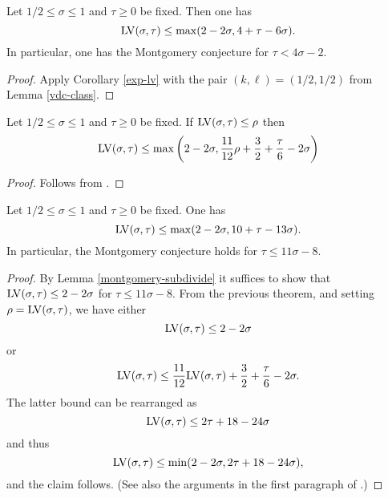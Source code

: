 \begin{theorem}\label{huxley-lv}\cite[Equation~(2.9)]{Huxley} Let $1/2 \leq \sigma \leq 1$ and $\tau \geq 0$ be fixed.  Then one has
    $$ \mathrm{LV}(\sigma,\tau) \leq \max( 2-2\sigma, 4 + \tau - 6 \sigma).$$
    In particular, one has the Montgomery conjecture for $\tau < 4 \sigma - 2$.
\end{theorem}

\literature
{}

\begin{proof}  Apply Corollary \ref{exp-lv} with the pair $(k,\ell) = (1/2,1/2)$ from Lemma \ref{vdc-class}.
\end{proof}





\begin{theorem}\label{heath_brown-lv-prelim} Let $1/2 \leq \sigma \leq 1$ and $\tau \geq 0$ be fixed.  If $\mathrm{LV}(\sigma, \tau) \le \rho$ then
    \[
    \mathrm{LV}(\sigma, \tau) \le \max\left(2 - 2\sigma, \frac{11}{12}\rho + \frac{3}{2} + \frac{\tau}{6} - 2\sigma\right)
    \]
\end{theorem}

\literature
{}

\begin{proof}
    Follows from \cite[Lemma~1]{heathbrown_zero_1979}.
\end{proof}

\begin{theorem}\label{hb-opt} Let $1/2 \leq \sigma \leq 1$ and $\tau \geq 0$ be fixed.   One has
    $$ \mathrm{LV}(\sigma,\tau) \leq \max( 2-2\sigma, 10 + \tau - 13 \sigma).$$
In particular, the Montgomery conjecture holds for $\tau \leq 11 \sigma - 8$.
\end{theorem}

\begin{proof}  By Lemma \ref{montgomery-subdivide} it suffices to show that $\mathrm{LV}(\sigma,\tau) \leq 2-2\sigma$ for $\tau \leq 11\sigma-8$.  From the previous theorem, and setting $\rho = \mathrm{LV}(\sigma,\tau)$, we have either
$$ \mathrm{LV}(\sigma,\tau) \leq 2-2\sigma$$
or
$$ \mathrm{LV}(\sigma,\tau) \leq \frac{11}{12}\mathrm{LV}(\sigma,\tau) + \frac{3}{2} + \frac{\tau}{6} - 2\sigma.$$
The latter bound can be rearranged as
$$ \mathrm{LV}(\sigma,\tau) \leq 2\tau + 18 - 24\sigma$$
and thus
$$ \mathrm{LV}(\sigma,\tau) \leq \min( 2-2\sigma, 2\tau + 18 - 24\sigma),$$
and the claim follows.  (See also the arguments in the first paragraph of \cite[p. 226]{heathbrown_zero_1979}.)
\end{proof}


